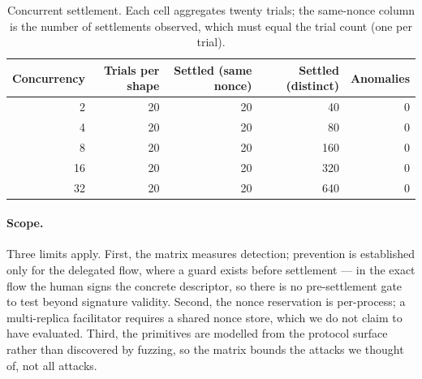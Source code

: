 \begin{table}[t]
\centering
\small
\caption{Concurrent settlement. Each cell aggregates twenty trials; the
same-nonce column is the number of settlements observed, which must equal the
trial count (one per trial).}
\label{tab:concurrency}
\begin{tabular}{@{}rrrrr@{}}
\toprule
Concurrency & Trials per shape & Settled (same nonce) & Settled (distinct) & Anomalies \\
\midrule
2  & 20 & 20  & 40  & 0 \\
4  & 20 & 20  & 80  & 0 \\
8  & 20 & 20  & 160 & 0 \\
16 & 20 & 20  & 320 & 0 \\
32 & 20 & 20  & 640 & 0 \\
\bottomrule
\end{tabular}
\end{table}

\paragraph{Scope.}
Three limits apply. First, the matrix measures detection; prevention is
established only for the delegated flow, where a guard exists before settlement
--- in the exact flow the human signs the concrete descriptor, so there is no
pre-settlement gate to test beyond signature validity. Second, the nonce
reservation is per-process; a multi-replica facilitator requires a shared nonce
store, which we do not claim to have evaluated. Third, the primitives are
modelled from the protocol surface rather than discovered by fuzzing, so the
matrix bounds the attacks we thought of, not all attacks.
